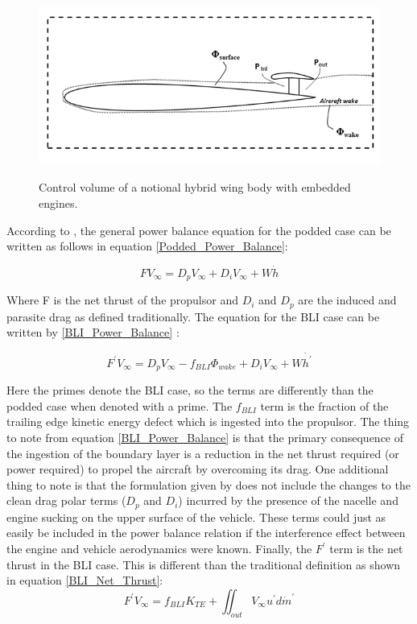 \documentclass[12pt]{gatech-thesis}
\begin{document}
	\begin{figure}[htpb]
	\centering
	\includegraphics[width=120mm, height =60mm, clip=true]{Figure5_Control_Volume.png}
	\caption{Control volume of a notional hybrid wing body with embedded engines.}
	\label{Control_Volume}
	\end{figure}

According to \cite{Plas2007}, the general power balance equation for the podded case can be written as follows in equation \ref{Podded_Power_Balance}:

   \begin{equation}FV_\infty = D_{p}V_\infty + D_{i} V_\infty + W\dot{h}\label{Podded_Power_Balance}\end{equation}%

Where F is the net thrust of the propulsor and $D_i$ and $D_p$ are the induced and parasite drag as defined traditionally.  The equation for the BLI case can be written by \ref{BLI_Power_Balance} \cite{Plas2007}:

   \begin{equation}F^\prime V_\infty = D_p V_\infty - f_{BLI}\Phi_{wake} + D_{i} V_\infty + W\dot{h^\prime}\label{BLI_Power_Balance}\end{equation}%

Here the primes denote the BLI case, so the terms are differently than the podded case when denoted with a prime.  The $f_{BLI}$ term is the fraction of the trailing edge kinetic energy defect which is ingested into the propulsor.  The thing to note from equation \ref{BLI_Power_Balance} is that the primary consequence of the ingestion of the boundary layer is a reduction in the net thrust required (or power required) to propel the aircraft by overcoming its drag.  One additional thing to note is that the formulation given by \cite{Plas2007} does not include the changes to the clean drag polar terms ($D_p$ and $D_i$) incurred by the presence of the nacelle and engine sucking on the upper surface of the vehicle.  These terms could just as easily be included in the power balance relation if the interference effect between the engine and vehicle aerodynamics were known.  Finally, the $F^\prime$ term is the net thrust in the BLI case.  This is different than the traditional definition as shown in equation \ref{BLI_Net_Thrust}:
 \begin{equation}F^\prime V_\infty = f_{BLI}K_{TE} + \iint_{out}{V_\infty}u^\prime d\dot{m}^\prime\label{BLI_Net_Thrust}\end{equation}%
\end{document}
